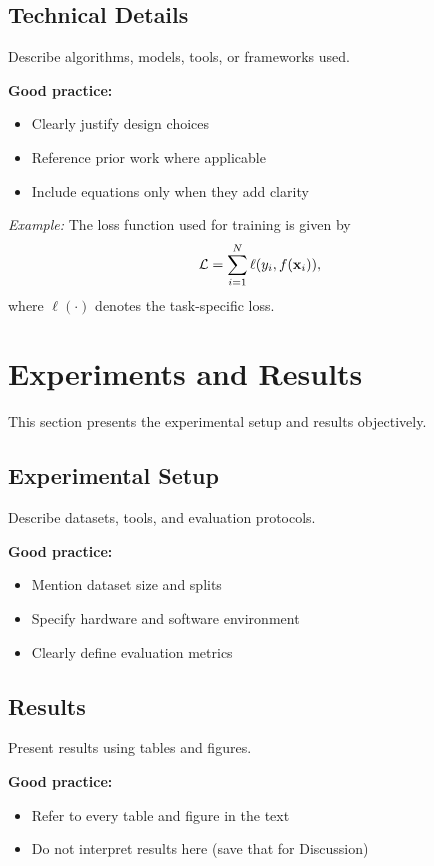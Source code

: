 \documentclass{article}
\def\x{{\mathbf x}}
\def\L{{\cal L}}
\begin{document}
\subsection{Technical Details}
Describe algorithms, models, tools, or frameworks used.

\textbf{Good practice:}
\begin{itemize}[noitemsep]
    \item Clearly justify design choices
    \item Reference prior work where applicable
    \item Include equations only when they add clarity
\end{itemize}

\emph{Example:}
The loss function used for training is given by
\begin{equation}
\L = \sum_{i=1}^{N} \ell(y_i, f(\x_i)),
\end{equation}
where $\ell(\cdot)$ denotes the task-specific loss.

\section{Experiments and Results}

This section presents the experimental setup and results objectively.

\subsection{Experimental Setup}
Describe datasets, tools, and evaluation protocols.

\textbf{Good practice:}
\begin{itemize}[noitemsep]
    \item Mention dataset size and splits
    \item Specify hardware and software environment
    \item Clearly define evaluation metrics
\end{itemize}

\subsection{Results}
Present results using tables and figures.

\textbf{Good practice:}
\begin{itemize}[noitemsep]
    \item Refer to every table and figure in the text
    \item Do not interpret results here (save that for Discussion)
\end{itemize}
\end{document}

